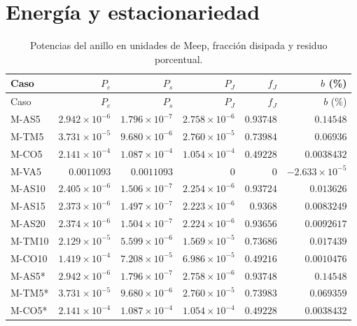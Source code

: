 \section{Energía y estacionariedad}
\begingroup\small\setlength{\tabcolsep}{4pt}
\begin{longtable}{lrrrrr}
\caption{Potencias del anillo en unidades de Meep, fracción disipada y residuo porcentual.}\label{t:ban}\\
\hline Caso & $P_e$ & $P_s$ & $P_J$ & $f_J$ & $b$ (\%) \\ \hline\endfirsthead
\hline Caso & $P_e$ & $P_s$ & $P_J$ & $f_J$ & $b$ (\%) \\ \hline\endhead
M-AS5 & $2.942\times 10^{-6}$ & $1.796\times 10^{-7}$ & $2.758\times 10^{-6}$ & $0.93748$ & $0.14548$ \\
M-TM5 & $3.731\times 10^{-5}$ & $9.680\times 10^{-6}$ & $2.760\times 10^{-5}$ & $0.73984$ & $0.06936$ \\
M-CO5 & $2.141\times 10^{-4}$ & $1.087\times 10^{-4}$ & $1.054\times 10^{-4}$ & $0.49228$ & $0.0038432$ \\
M-VA5 & $0.0011093$ & $0.0011093$ & $0$ & $0$ & $-2.633\times 10^{-5}$ \\
M-AS10 & $2.405\times 10^{-6}$ & $1.506\times 10^{-7}$ & $2.254\times 10^{-6}$ & $0.93724$ & $0.013626$ \\
M-AS15 & $2.373\times 10^{-6}$ & $1.497\times 10^{-7}$ & $2.223\times 10^{-6}$ & $0.9368$ & $0.0083249$ \\
M-AS20 & $2.374\times 10^{-6}$ & $1.504\times 10^{-7}$ & $2.224\times 10^{-6}$ & $0.93656$ & $0.0092617$ \\
M-TM10 & $2.129\times 10^{-5}$ & $5.599\times 10^{-6}$ & $1.569\times 10^{-5}$ & $0.73686$ & $0.017439$ \\
M-CO10 & $1.419\times 10^{-4}$ & $7.208\times 10^{-5}$ & $6.986\times 10^{-5}$ & $0.49216$ & $0.0010476$ \\
M-AS5* & $2.942\times 10^{-6}$ & $1.796\times 10^{-7}$ & $2.758\times 10^{-6}$ & $0.93748$ & $0.14548$ \\
M-TM5* & $3.731\times 10^{-5}$ & $9.680\times 10^{-6}$ & $2.760\times 10^{-5}$ & $0.73983$ & $0.069359$ \\
M-CO5* & $2.141\times 10^{-4}$ & $1.087\times 10^{-4}$ & $1.054\times 10^{-4}$ & $0.49228$ & $0.0038432$ \\
\hline\end{longtable}\endgroup
\begingroup\small\setlength{\tabcolsep}{4pt}
